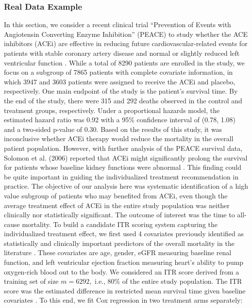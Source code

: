 \documentclass[12pt]{article}
\begin{document}
\subsubsection{Real Data Example}
In this section, we consider a recent clinical trial “Prevention of Events with Angiotensin Converting Enzyme Inhibition” (PEACE) to study whether the ACE inhibitors (ACEi) are effective in reducing future cardiovascular-related events for patients with stable coronary artery disease and normal or slightly reduced left ventricular function \cite{peace2004angiotensin}. While a total of 8290 patients are enrolled in the study,  we focus on a subgroup of 7865 patients with complete covariate information, in which 3947 and 3603 patients were assigned to receive the ACEi and placebo, respectively.  One main endpoint of the study is the patient’s survival time.  By the end of the study, there were 315 and 292 deaths observed in the control and treatment groups, respectively. Under a proportional hazards model, the estimated hazard ratio was 0.92 with a 95\% confidence interval of (0.78, 1.08) and a two-sided p-value of 0.30. Based on the results of this study, it was inconclusive whether ACEi therapy would reduce the mortality in the overall patient population. However, with further analysis of the PEACE survival data, Solomon et al. (2006) reported that ACEi might significantly prolong the survival for patients whose baseline kidney functions were  abnormal \cite{solomon2006renal}. This finding could be quite important in guiding the individualized treatment recommendation in practice. The objective of our analysis here was systematic identification of a high value subgroup of patients who may benefited from ACEi, even though the average treatment effect of ACEi in the entire study population was neither clinically nor statistically significant. The outcome of interest was the time to all-cause mortality. To build a candidate ITR scoring system capturing the individualized treatment effect, we first used 4 covariates previously identified as statistically and clinically important predictors of the overall mortality in the literature \cite{solomon2006renal}. These covariates are age, gender, eGFR measuring baseline renal function, and left ventricular ejection fraction measuring heart’s ability to pump oxygen-rich blood out to the body.  We considered an ITR score derived from a training set of size $m=6292,$ i.e., 80\% of the entire study population.  The ITR score was the estimated difference in restricted mean survival time given baseline covariates \cite{uno2014moving, zhao2016restricted}. To this end, we fit Cox regression in two treatment arms separately: 
\end{document}
